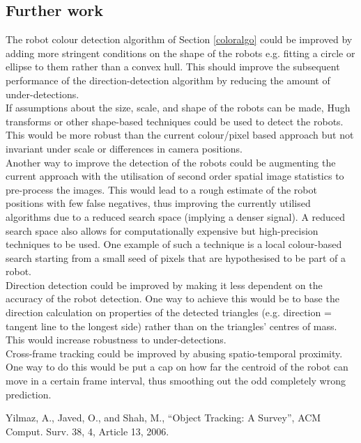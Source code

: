 \documentclass[10pt,a4paper]{article}
\begin{document}
\subsection{Further work}\label{furtherwork}
The robot colour detection algorithm of Section \ref{coloralgo} could be improved
by adding more stringent conditions on the shape of the robots e.g. fitting a
circle or ellipse to them rather than a convex hull. This should improve the
subsequent performance of the direction-detection algorithm by reducing the
amount of under-detections.\\
If assumptions about the size, scale, and shape of the robots can be made, Hugh 
transforms or other shape-based techniques could be used to detect the robots.
This would be more robust than the current colour/pixel based approach but not 
invariant under scale or differences in camera positions.\\
Another way to improve the detection of the robots could be augmenting the
current approach with the utilisation of second order spatial image statistics
to pre-process the images. This would lead to a rough estimate of the robot
positions with few false negatives, thus improving the currently utilised
algorithms due to a reduced search space (implying a denser signal). A reduced
search space also allows for computationally expensive but high-precision 
techniques to be used. One example of such a technique is a local colour-based
search starting from a small seed of pixels that are hypothesised to be part of
a robot.\\
Direction detection could be improved by making it less dependent on the
accuracy of the robot detection. One way to achieve this would be to base the 
direction calculation on properties of the detected triangles (e.g. direction =
tangent line to the longest side) rather than on the triangles' centres of 
mass. This would increase robustness to under-detections.\\
Cross-frame tracking could be improved by abusing spatio-temporal proximity. One
way to do this would be put a cap on how far the centroid of the robot can move 
in a certain frame interval, thus smoothing out the odd completely wrong 
prediction.



\begin{thebibliography}{10}
 Yilmaz, A., Javed, O., and Shah, M., 
``Object Tracking: A Survey'', 
ACM Comput. Surv. 38, 4, Article 13, 2006.  
\end{thebibliography}
\end{document}

